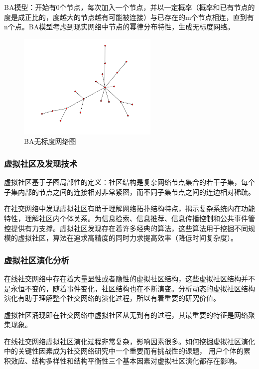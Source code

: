 \documentclass[12pt]{report}
\begin{document}
				BA模型：开始有0个节点，每次加入一个节点，并以一定概率（概率和已有节点的度是成正比的，度越大的节点越有可能被连接）与已存在的m个节点相连，直到有n个点。BA模型考虑到现实网络中节点的幂律分布特性，生成无标度网络。
				
				\begin{figure}
					\centering
					\includegraphics[width=0.6\textwidth]{img/BA.png}
					\caption{BA无标度网络图} 
					\label{img}
				\end{figure}
			
			\subsubsection{虚拟社区及发现技术}
			
				虚拟社区基于子图局部性的定义：社区结构是复杂网络节点集合的若干子集，每个子集内部的节点之间的连接相对非常紧密，而不同子集节点之间的连边相对稀疏。
			
				在社交网络中发现虚拟社区有助于理解网络拓扑结构特点，揭示复杂系统内在功能特性，理解社区内个体关系。为信息检索、信息推荐、信息传播控制和公共事件管控提供有力支撑。虚拟社区发现存在着许多经典的算法，这些算法用于挖掘不同规模的虚拟社区，算法在追求高精度的同时力求提高效率（降低时间复杂度）。
			
			\subsubsection{虚拟社区演化分析}
				
				在线社交网络中存在着大量显性或者隐性的虚拟社区结构，这些虚拟社区结构并不是永恒不变的，随着事件变化，社区结构也在不断演变。分析动态的虚拟社区结构演化有助于理解整个社交网络的演化过程，所以有着重要的研究价值。
				
				虚拟社区涌现即在社交网络中虚拟社区从无到有的过程，其最重要的特征是网络聚集现象。
				
				在线社交网络虚拟社区演化过程非常复杂，影响因素很多。如何挖掘虚拟社区演化中的关键性因素成为社交网络研究中一个重要而有挑战性的课题， 用户个体的累积效应、结构多样性和结构平衡性三个基本因素对虚拟社区演化都存在影响。
		
\end{document}
